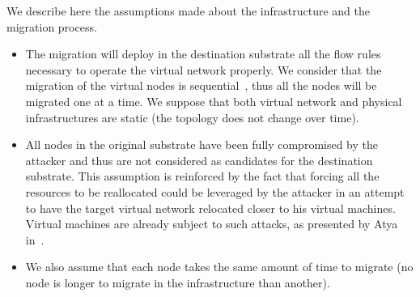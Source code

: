 \label{sec:mdp-system-hypotheses}
We describe here the assumptions made about the infrastructure and the migration process.

\begin{itemize}

    \item
    The migration will deploy in the destination substrate all the flow rules necessary to operate the virtual network properly. We consider that the migration of the virtual nodes is sequential~\cite{Lime-Ghorbani2014}, thus all the nodes will be migrated one at a time.
    We suppose that both virtual network and physical infrastructures are static (\ie the topology does not change over time).
    
    \item All nodes in the original substrate have been fully compromised by the attacker and thus are not considered as candidates for the destination substrate.  
    This assumption is reinforced by the fact that forcing all the resources to be reallocated could be leveraged by the attacker in an attempt to have the target virtual network relocated closer to his virtual machines.
    Virtual machines are already subject to such attacks, as presented by Atya \etal in~\cite{stalling-atya2017,malicious-atya2017}.

    \item
    We also assume that each node takes the same amount of time to migrate (\ie no node is longer to migrate in the infrastructure than another).
\end{itemize}